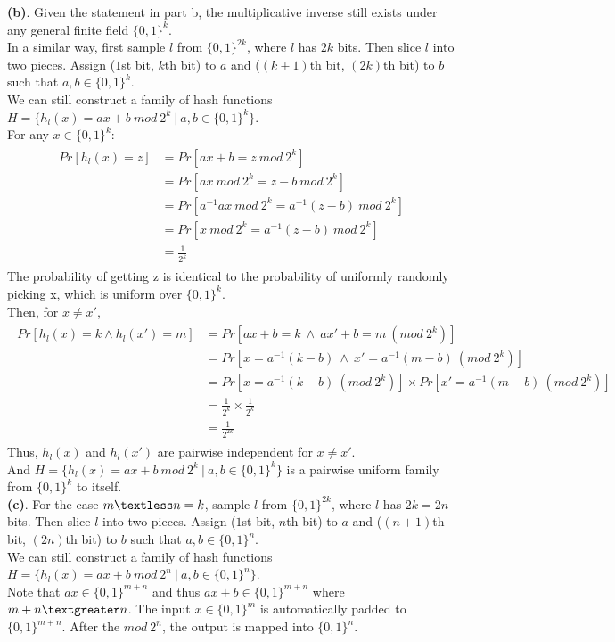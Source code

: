 \documentclass[titlepage, paper=a4, fontsize=11pt]{scrartcl} %
\numberwithin{equation}{section} %
\numberwithin{figure}{section} %
\numberwithin{table}{section} %
\begin{document}
\textbf{(b)}. Given the statement in part b, the multiplicative inverse still exists under any general finite field $\{0,1\}^k$. \\
In a similar way, first sample $l$ from $\{0,1\}^{2k}$, where $l$ has $2k$ bits. Then slice $l$ into two pieces.
Assign ($1$st bit, $k$th bit) to $a$ and ($(k+1)$th bit, $(2k)$th bit) to $b$ such that $a,b \in \{0,1\}^k$. \\
We can still construct a family of hash functions $H=\{ h_l(x)=ax+b \ mod \ 2^k\ |\ a,b \in \{0,1\}^k \}$. \\
For any $x \in \{0,1\}^k$:
\begin{align*} 
\begin{split}
Pr[h_l(x) = z] &= Pr[ax+b = z \ mod \ 2^k] \\
&= Pr[ax \ mod \ 2^k = z-b \ mod \ 2^k] \\
&= Pr[a^{-1}ax \ mod \ 2^k = a^{-1}(z-b) \ mod \ 2^k] \\
&= Pr[x \ mod \ 2^k = a^{-1}(z-b) \ mod \ 2^k] \\
&= \frac{1}{2^k}
\end{split}					
\end{align*}
The probability of getting z is identical to the probability of uniformly randomly picking x, which is uniform over
$\{0,1\}^k$. \\
Then, for $x \neq x'$,
\begin{align*} 
\begin{split}
Pr[h_l(x) = k \land h_l(x') = m] &= Pr[ax+b=k \ \land \ ax'+b=m \  (mod\ 2^k)] \\
&= Pr[x=a^{-1}(k-b) \ \land \ x'=a^{-1}(m-b) \  (mod\ 2^k)] \\
&= Pr[x=a^{-1}(k-b) \  (mod\ 2^k)] \times Pr[x'=a^{-1}(m-b) \ (mod\ 2^k)] \\
&= \frac{1}{2^k} \times \frac{1}{2^k} \\
&= \frac{1}{2^{2k}}
\end{split}					
\end{align*}
Thus, $h_l(x)$ and $h_l(x')$ are pairwise independent for $x \neq x'$. \\
And $H=\{ h_l(x)=ax+b \ mod\ 2^k\ |\ a,b \in \{0,1\}^k \}$ is a pairwise uniform family from $\{0,1\}^k$ to itself. \\

\textbf{(c)}. For the case $m \textless n = k$, sample $l$ from $\{0,1\}^{2k}$, where $l$ has $2k=2n$ bits. Then slice $l$ into two pieces.
Assign ($1$st bit, $n$th bit) to $a$ and ($(n+1)$th bit, $(2n)$th bit) to $b$ such that $a,b \in \{0,1\}^n$. \\
We can still construct a family of hash functions $H=\{ h_l(x)=ax+b \ mod \ 2^n\ |\ a,b \in \{0,1\}^n \}$. \\
Note that $ax \in \{0,1\}^{m+n}$ and thus $ax+b \in \{0,1\}^{m+n}$ where
$m+n \textgreater n$. The input $x \in \{0,1\}^m$ is automatically padded to $\{0,1\}^{m+n}$. After the $mod \ 2^n$, the output is mapped into $\{0,1\}^n$. \\
\end{document}
